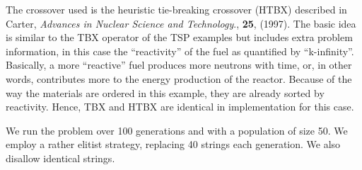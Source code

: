\documentclass[letterpaper,11pt,english]{sphinxmanual}
\begin{document}
The crossover used is the heuristic tie-breaking crossover
(HTBX) described in Carter, \emph{Advances in Nuclear Science and
Technology}., \textbf{25}, (1997).  The basic idea is similar
to the TBX operator of the TSP examples but includes extra
problem information, in this case the ``reactivity'' of the fuel
as quantified by ``k-infinity''.  Basically, a more ``reactive''
fuel produces more neutrons with time, or, in other words,
contributes more to the energy production of the reactor.
Because of the way the materials are ordered in this example,
they are already sorted by reactivity.  Hence, TBX and HTBX
are identical in implementation for this case.

We run the problem over 100 generations and with a population
of size 50.  We employ a rather elitist strategy, replacing
40 strings each generation.  We also disallow identical strings.
\end{document}
